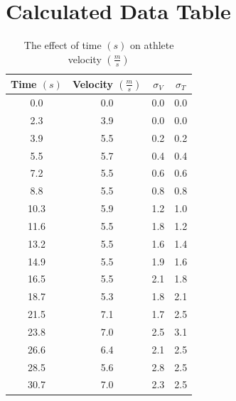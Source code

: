 \documentclass[index]{subfiles}
\begin{document}
\section{Calculated Data Table}


\begin{table}[H]
    \centering
    \caption{The effect of time \((s)\) on athlete velocity \((\frac{m}{s})\)}
    \begin{tabular}{@{}cccc@{}} \toprule
        {Time \((s)\)} & {Velocity \((\frac{m}{s})\)} & {\(\sigma_{V}\)} & {\(\sigma_{T}\)} \\ \midrule
        0.0            & 0.0                          & 0.0              & 0.0              \\
        2.3            & 3.9                          & 0.0              & 0.0              \\
        3.9            & 5.5                          & 0.2              & 0.2              \\
        5.5            & 5.7                          & 0.4              & 0.4              \\
        7.2            & 5.5                          & 0.6              & 0.6              \\
        8.8            & 5.5                          & 0.8              & 0.8              \\
        10.3           & 5.9                          & 1.2              & 1.0              \\
        11.6           & 5.5                          & 1.8              & 1.2              \\
        13.2           & 5.5                          & 1.6              & 1.4              \\
        14.9           & 5.5                          & 1.9              & 1.6              \\
        16.5           & 5.5                          & 2.1              & 1.8              \\
        18.7           & 5.3                          & 1.8              & 2.1              \\
        21.5           & 7.1                          & 1.7              & 2.5              \\
        23.8           & 7.0                          & 2.5              & 3.1              \\
        26.6           & 6.4                          & 2.1              & 2.5              \\
        28.5           & 5.6                          & 2.8              & 2.5              \\
        30.7           & 7.0                          & 2.3              & 2.5
    \end{tabular}
\end{table}
\end{document}
